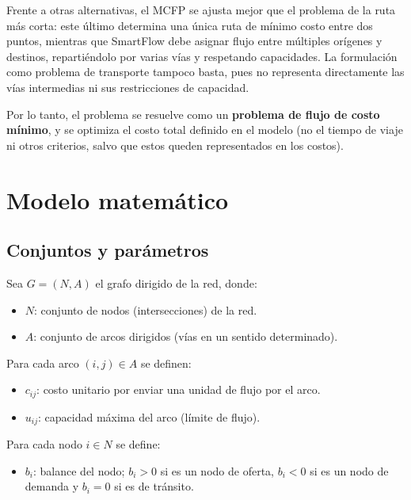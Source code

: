 \documentclass{article}
\begin{document}
Frente a otras alternativas, el MCFP se ajusta mejor que el problema de la ruta
más corta: este último determina una única ruta de mínimo costo entre dos
puntos, mientras que SmartFlow debe asignar flujo entre múltiples orígenes y
destinos, repartiéndolo por varias vías y respetando capacidades. La
formulación como problema de transporte tampoco basta, pues no representa
directamente las vías intermedias ni sus restricciones de capacidad.

Por lo tanto, el problema se resuelve como un \textbf{problema de flujo de costo
mínimo}, y se optimiza el costo total definido en el modelo (no el tiempo de
viaje ni otros criterios, salvo que estos queden representados en los costos).

\section{Modelo matemático}

\subsection{Conjuntos y parámetros}

Sea $G = (N, A)$ el grafo dirigido de la red, donde:
\begin{itemize}
    \item $N$: conjunto de nodos (intersecciones) de la red.
    \item $A$: conjunto de arcos dirigidos (vías en un sentido determinado).
\end{itemize}

Para cada arco $(i,j) \in A$ se definen:
\begin{itemize}
    \item $c_{ij}$: costo unitario por enviar una unidad de flujo por el arco.
    \item $u_{ij}$: capacidad máxima del arco (límite de flujo).
\end{itemize}

Para cada nodo $i \in N$ se define:
\begin{itemize}
    \item $b_i$: balance del nodo; $b_i > 0$ si es un nodo de oferta,
          $b_i < 0$ si es un nodo de demanda y $b_i = 0$ si es de tránsito.
\end{itemize}
\end{document}
